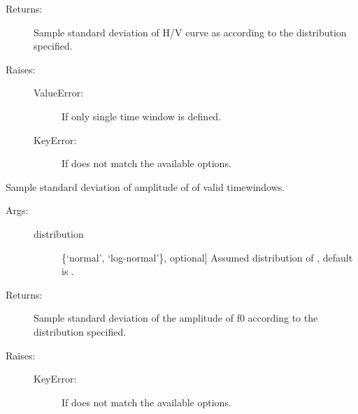 \documentclass[letterpaper,10pt,english,openany,oneside]{sphinxmanual}
\begin{document}
\begin{fulllineitems}
\begin{fulllineitems}
\begin{description}
\begin{description}
\end{description}

\item[{Returns:}] \leavevmode
Sample standard deviation of H/V curve as 
according to the distribution specified.

\item[{Raises:}] \leavevmode\begin{description}
\item[{ValueError:}] \leavevmode
If only single time window is defined.

\item[{KeyError:}] \leavevmode
If  does not match the available options.

\end{description}

\end{description}

\end{fulllineitems}


\begin{fulllineitems}
\label{\detokenize{index:hvsrpy.Hvsr.std_f0_amp}}
Sample standard deviation of amplitude of  of valid
timewindows.
\begin{description}
\item[{Args:}] \leavevmode\begin{description}
\item[{distribution}] \leavevmode{[}\{‘normal’, ‘log-normal’\}, optional{]}
Assumed distribution of , default is .

\end{description}

\item[{Returns:}] \leavevmode
Sample standard deviation of the amplitude of f0 according
to the distribution specified.

\item[{Raises:}] \leavevmode\begin{description}
\item[{KeyError:}] \leavevmode
If  does not match the available options.

\end{description}


\end{description}
\end{fulllineitems}
\end{fulllineitems}
\end{document}
